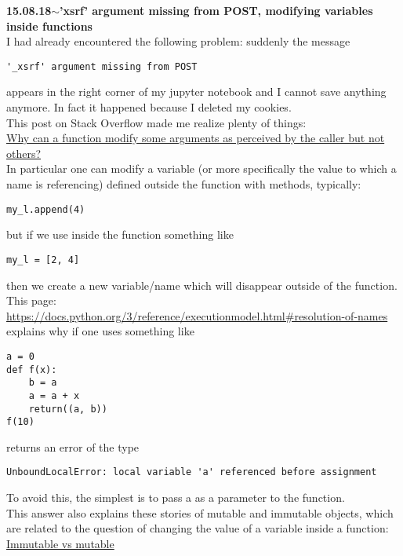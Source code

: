 \documentclass[11pt,a4paper]{article}
\newenvironment{loggentry}[2]%
{\noindent\textbf{#1}\hspace{1cm}$\mathbf{\sim}$\text{ }\textbf{#2}\\}{\vspace{0.5cm}}
\begin{document}
\begin{loggentry}{15.08.18}{'xsrf' argument missing from POST, modifying variables inside functions}
I had already encountered the following problem: suddenly the message
\begin{verbatim}
'_xsrf' argument missing from POST
\end{verbatim}
appears in the right corner of my jupyter notebook and I cannot save anything anymore. In fact it happened because I deleted my cookies.\\

This post on Stack Overflow made me realize plenty of things:\\
\href{https://stackoverflow.com/questions/575196/why-can-a-function-modify-some-arguments-as-perceived-by-the-caller-but-not-oth}{Why can a function modify some arguments as perceived by the caller but not others?}\\
In particular one can modify a variable (or more specifically the value to which a name is referencing) defined outside the function with methods, typically:\\
\begin{verbatim}
my_l.append(4)
\end{verbatim}
but if we use inside the function something like
\begin{verbatim}
my_l = [2, 4]
\end{verbatim}
then we create a new variable/name which will disappear outside of the function.\\
This page:\\
\url{https://docs.python.org/3/reference/executionmodel.html#resolution-of-names}\\
explains why if one uses something like
\begin{verbatim}
a = 0
def f(x):
    b = a
    a = a + x
    return((a, b))
f(10)
\end{verbatim}
returns an error of the type
\begin{verbatim}
UnboundLocalError: local variable 'a' referenced before assignment
\end{verbatim}
To avoid this, the simplest is to pass a as a parameter to the function.\\
This answer also explains these stories of mutable and immutable objects, which are related to the question of changing the value of a variable inside a function:\\
\href{https://stackoverflow.com/questions/8056130/immutable-vs-mutable-types#8059504}{Immutable vs mutable}\\

\end{loggentry}
\end{document}
